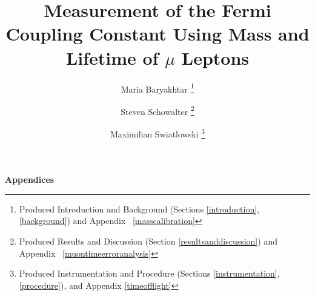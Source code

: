 \documentclass[psfig,12pt,notitlepage]{article}
\begin{document}
\title{Measurement of the Fermi Coupling Constant Using Mass and Lifetime
of $\mu$ Leptons} \author{Maria Baryakhtar \footnote{Produced
Introduction and Background (Sections \ref{introduction},
\ref{background}) and Appendix ~\ref{masscalibration}} \and Steven
Schowalter \footnote{Produced Results and Discussion (Section
\ref{resultsanddiscussion}) and Appendix ~\ref{muontimeerroranalysis}}
\and Maximilian Swiatlowski
\footnote{Produced Instrumentation and Procedure (Sections
\ref{instrumentation}, \ref{procedure}), and Appendix
\ref{timeofflight}}}

\maketitle
\thispagestyle{empty}



\clearpage
\tableofcontents
\setcounter{tocdepth}{2}


\clearpage












\newpage

\appendix

\begin{center}
\begin{Large}
\bfseries{Appendices}
\end{Large}
\end{center}







\end{document}
